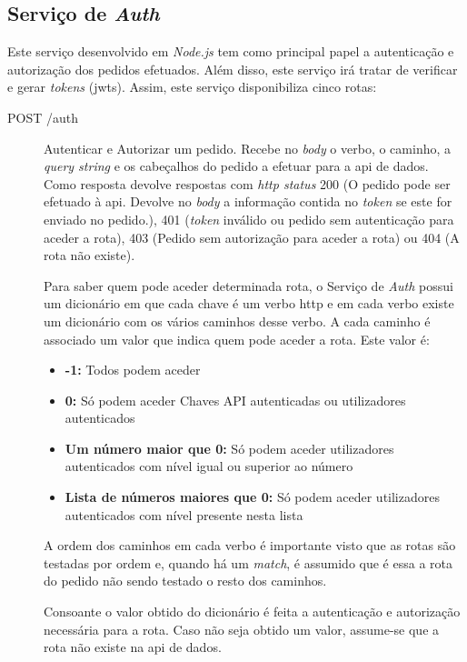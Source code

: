 \subsection{Serviço de \textit{Auth}}
Este serviço desenvolvido em \textit{Node.js} tem como principal papel a autenticação e autorização dos pedidos efetuados. Além disso, este serviço irá tratar de verificar e gerar \textit{tokens} (\acrshort{jwt}s). Assim, este serviço disponibiliza cinco rotas:
\begin{description}
    \item[POST /auth] Autenticar e Autorizar um pedido. Recebe no \textit{body} o verbo, o caminho, a \textit{query string} e os cabeçalhos do pedido a efetuar para a \acrshort{api} de dados. Como resposta devolve respostas com \textit{\acrshort{http} status} 200 (O pedido pode ser efetuado à \acrshort{api}. Devolve no \textit{body}  a informação contida no \textit{token} se este for enviado no pedido.), 401 (\textit{token} inválido ou pedido sem autenticação para aceder a rota), 403 (Pedido sem autorização para aceder a rota) ou 404 (A rota não existe).

        Para saber quem pode aceder determinada rota, o Serviço de \textit{Auth} possui um dicionário em que cada chave é um verbo \acrshort{http} e em cada verbo existe um dicionário com os vários caminhos desse verbo. A cada caminho é associado um valor que indica quem pode aceder a rota. Este valor é:
        \begin{itemize}
            \item \textbf{-1:} Todos podem aceder
            \item \textbf{0:} Só podem aceder Chaves API autenticadas ou utilizadores autenticados
            \item \textbf{Um número maior que 0:} Só podem aceder utilizadores autenticados com nível igual ou superior ao número
            \item \textbf{Lista de números maiores que 0:} Só podem aceder utilizadores autenticados com nível presente nesta lista
        \end{itemize}
        A ordem dos caminhos em cada verbo é importante visto que as rotas são testadas por ordem e, quando há um \textit{match}, é assumido que é essa a rota do pedido não sendo testado o resto dos caminhos.

        Consoante o valor obtido do dicionário é feita a autenticação e autorização necessária para a rota. Caso não seja obtido um valor, assume-se que a rota não existe na \acrshort{api} de dados.


\end{description}
